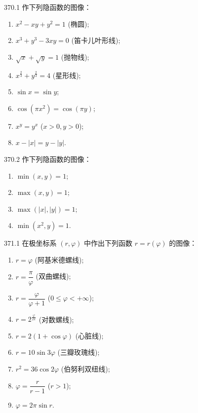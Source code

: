 \begin{prob}[L]{370.1}
作下列隐函数的图像：
\begin{enumerate}[label=(\alph*), itemsep=2pt, topsep=3pt]
  \item $x^2 - xy + y^2 = 1$ (椭圆);
  \item $x^3 + y^3 - 3xy = 0$ (笛卡儿叶形线);
  \item $\sqrt{x} + \sqrt{y} = 1$ (抛物线);
  \item $x^{\frac{2}{3}} + y^{\frac{2}{3}} = 4$ (星形线);
  \item $\sin x = \sin y$;
  \item $\cos(\pi x^2) = \cos(\pi y)$;
  \item $x^y = y^x$ ($x > 0, y > 0$);
  \item $x - |x| = y - |y|$.
\end{enumerate}
\end{prob}

\begin{prob}[L]{370.2}
作下列隐函数的图像：
\begin{enumerate}[label=(\alph*), itemsep=2pt, topsep=3pt]
  \item $\min(x, y) = 1$;
  \item $\max(x, y) = 1$;
  \item $\max(|x|, |y|) = 1$;
  \item $\min(x^2, y) = 1$.
\end{enumerate}
\end{prob}

\begin{prob}[L]{371.1}
在极坐标系 $(r, \varphi)$ 中作出下列函数 $r = r(\varphi)$ 的图像：
\begin{enumerate}[label=(\alph*), itemsep=2pt, topsep=3pt]
  \item $r = \varphi$ (阿基米德螺线);
  \item $r = \dfrac{\pi}{\varphi}$ (双曲螺线);
  \item $r = \dfrac{\varphi}{\varphi + 1}$ ($0 \leqslant \varphi < +\infty$);
  \item $r = 2^{\frac{\varphi}{2\pi}}$ (对数螺线);
  \item $r = 2(1 + \cos\varphi)$ (心脏线);
  \item $r = 10\sin 3\varphi$ (三瓣玫瑰线);
  \item $r^2 = 36\cos 2\varphi$ (伯努利双纽线);
  \item $\varphi = \dfrac{r}{r - 1}$ ($r > 1$);
  \item $\varphi = 2\pi\sin r$.
\end{enumerate}
\end{prob}

